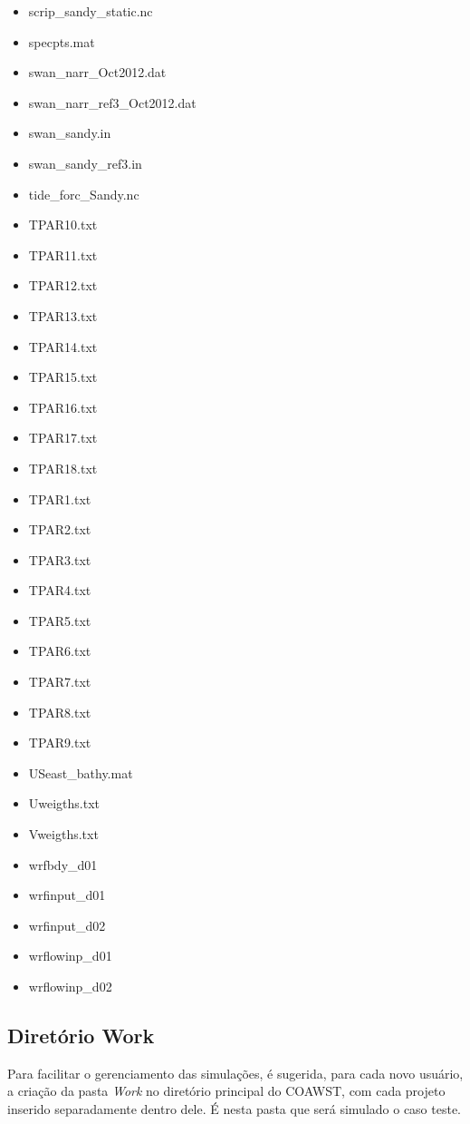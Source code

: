 \begin{itemize}
\item scrip\_sandy\_static.nc
\item specpts.mat
\item swan\_narr\_Oct2012.dat
\item swan\_narr\_ref3\_Oct2012.dat
\item swan\_sandy.in
\item swan\_sandy\_ref3.in
\item tide\_forc\_Sandy.nc
\item TPAR10.txt
\item TPAR11.txt
\item TPAR12.txt
\item TPAR13.txt
\item TPAR14.txt
\item TPAR15.txt
\item TPAR16.txt
\item TPAR17.txt
\item TPAR18.txt
\item TPAR1.txt
\item TPAR2.txt
\item TPAR3.txt
\item TPAR4.txt
\item TPAR5.txt
\item TPAR6.txt
\item TPAR7.txt
\item TPAR8.txt
\item TPAR9.txt
\item USeast\_bathy.mat
\item Uweigths.txt
\item Vweigths.txt
\item wrfbdy\_d01
\item wrfinput\_d01
\item wrfinput\_d02
\item wrflowinp\_d01
\item wrflowinp\_d02
\end{itemize}
\bigskip

\subsection{Diretório Work}\label{workcoawstsec}
\bigskip

\noindent Para facilitar o gerenciamento das simulações, é sugerida, para cada novo usuário, a criação da pasta \textit{Work} no 
          diretório principal do COAWST, com cada projeto inserido separadamente dentro dele. É nesta pasta que será simulado 
          o caso teste.
\bigskip

